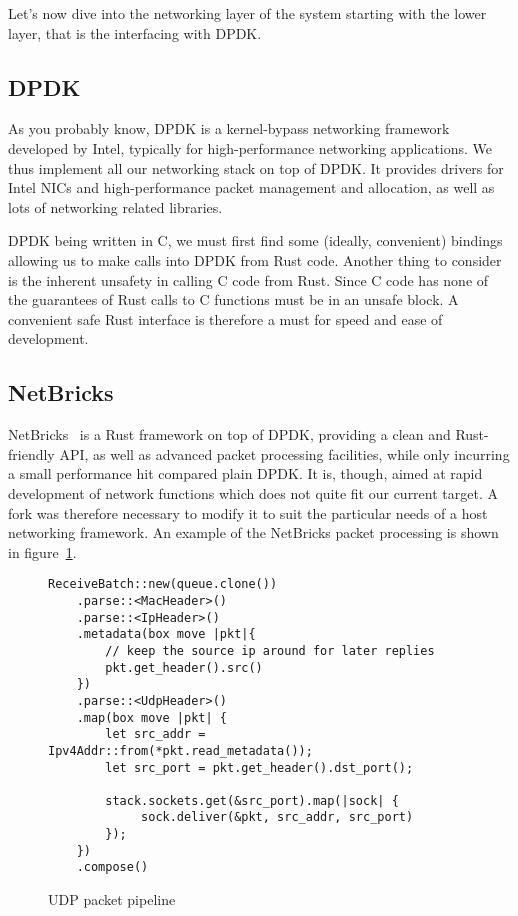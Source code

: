 \documentclass[11pt]{book}
\newcommand{\marios}[1]{\noindent{{\bf \fbox{MK:} {\textcolor{green}{\it#1}}}}}
\begin{document}
Let's now dive into the networking layer of the system starting with
the lower layer, that is the interfacing with DPDK.

\subsection{DPDK} 
\marios{First baragraph goes in the background.}
As you probably know, DPDK is a kernel-bypass networking framework
developed by Intel, typically for high-performance networking
applications. We thus implement all our networking stack on top of
DPDK. It provides drivers for Intel NICs and high-performance packet
management and allocation, as well as lots of networking related
libraries.

DPDK being written in C, we must first find some (ideally, convenient)
bindings allowing us to make calls into DPDK from Rust code. Another
thing to consider is the inherent unsafety in calling C code from
Rust. Since C code has none of the guarantees of Rust calls to C
functions must be in an unsafe block. A convenient safe Rust interface
is therefore a must for speed and ease of development.


\subsection{NetBricks}
\marios{Same here. Move the first paragraph in the background section 2 and talk only about the modifications here.}
NetBricks~\cite{netbricks} is a Rust framework on top of DPDK,
providing a clean and Rust-friendly API, as well as advanced packet
processing facilities, while only incurring a small performance hit
compared plain DPDK. It is, though, aimed at rapid development of
network functions which does not quite fit our current target. A fork
was therefore necessary to modify it to suit the particular needs of a
host networking framework. An example of the NetBricks packet
processing is shown in figure~\ref{code:udp-pipeline}.

\begin{figure}[htb!]
\begin{lstlisting}
ReceiveBatch::new(queue.clone())
    .parse::<MacHeader>()
    .parse::<IpHeader>()
    .metadata(box move |pkt|{
        // keep the source ip around for later replies
        pkt.get_header().src()
    })
    .parse::<UdpHeader>()
    .map(box move |pkt| {
        let src_addr = Ipv4Addr::from(*pkt.read_metadata());
        let src_port = pkt.get_header().dst_port();

        stack.sockets.get(&src_port).map(|sock| {
             sock.deliver(&pkt, src_addr, src_port)
        });
    })
    .compose()
\end{lstlisting}

  \label{code:udp-pipeline}
  \caption{UDP packet pipeline}
\end{figure}
\end{document}
